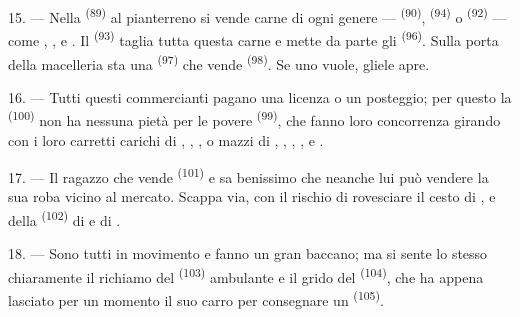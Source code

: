 \VUsaut{4.0mm}
\VUsaut{3.0mm}

15. --- Nella  \textsuperscript{(89)} al pianterreno si vende carne
di ogni genere ---  \textsuperscript{(90)}, 
\textsuperscript{(94)} o  \textsuperscript{(92)} --- come
, ,  e . Il
 \textsuperscript{(93)} taglia tutta questa carne e mette
da parte gli  \textsuperscript{(96)}. Sulla porta della macelleria sta
una  \textsuperscript{(97)} che vende 
\textsuperscript{(98)}. Se uno vuole, gliele apre.

16. --- Tutti questi commercianti pagano una licenza o un posteggio; per questo la
 \textsuperscript{(100)} non ha nessuna pietà per le povere
 \textsuperscript{(99)}, che fanno loro concorrenza girando
con i loro carretti carichi di , ,
,  o mazzi di , , , ,  e
.

\VUsaut{4.0mm}
\VUsaut{3.0mm}

17. --- Il ragazzo che vende  \textsuperscript{(101)} e 
sa benissimo che neanche lui può vendere la sua roba vicino al mercato. Scappa via, con
il rischio di rovesciare il cesto di ,  e
 della  \textsuperscript{(102)} di
 e di .

18. --- Sono tutti in movimento e fanno un gran baccano; ma si sente lo stesso
chiaramente il richiamo del  \textsuperscript{(103)} ambulante e il
grido del  \textsuperscript{(104)}, che ha appena lasciato per un
momento il suo carro per consegnare un 
\textsuperscript{(105)}.
\VUsaut{6.0mm}
\VUfilet{22mm}
